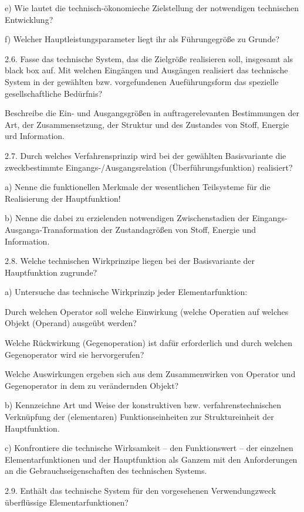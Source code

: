 \documentclass[11pt,a4paper]{article}
\begin{document}
e) Wie lautet die technisch-ökonomieche Zielstellung der notwendigen
technischen Entwicklung?

f) Welcher Hauptleistungsparameter liegt ihr als Führungegröße zu Grunde?

2.6. Fasse das technische System, das die Zielgröße realisieren soll,
insgesamt als black box auf. Mit welchen Eingängen und Ausgängen realisiert
das technische System in der gewählten bzw. vorgefundenen Aueführungsform das
spezielle gesellschaftliche Bedürfnis?

Beschreibe die Ein- und Ausgangsgrößen in auftragerelevanten Bestimmungen der
Art, der Zusammensetzung, der Struktur und des Zustandes von Stoff, Energie
urd Information.

2.7. Durch welches Verfahrensprinzip wird bei der gewählten Basisvariante die
zweckbestimmte Eingangs-/Ausgangsrelation (Überführungsfunktion) realisiert?

a) Nenne die funktionellen Merkmale der wesentlichen Teilsysteme für die
Realisierung der Hauptfunktion!

b) Nenne die dabei zu erzielenden notwendigen Zwischenstadien der
Eingangs-Ausganga-Tranaformation der Zustandagrößen von Stoff, Energie und
Information.

2.8. Welche technischen Wirkprinzipe liegen bei der Basisvariante der
Hauptfunktion zugrunde?

a) Untersuche das technische Wirkprinzip jeder Elementarfunktion:

Durch welchen Operator soll welche Einwirkung (welche Operatien auf welches
Objekt (Operand) ausgeübt werden?

Welche Rückwirkung (Gegenoperation) ist dafür erforderlich und durch welchen
Gegenoperator wird sie hervorgerufen?

Welche Auswirkungen ergeben sich aus dem Zusammenwirken von Operator und
Gegenoperator in dem zu verändernden Objekt?

b) Kennzeichne Art und Weise der konstruktiven bzw. verfahrenstechnischen
Verknüpfung der (elementaren) Funktionseinheiten zur Struktureinheit der
Hauptfunktion.

c) Konfrontiere die technische Wirksamkeit -- den Funktionswert -- der
einzelnen Elementarfunktionen und der Hauptfunktion als Ganzem mit den
Anforderungen an die Gebrauchseigenschaften des technischen Systems.

2.9. Enthält das technische System für den vorgesehenen Verwendungzweck
überflüssige Elementarfunktionen?
\end{document}
